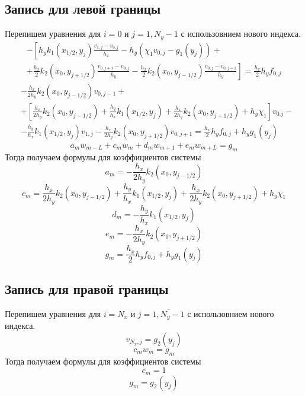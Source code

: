 \subsection{Запись для левой границы}
Перепишем уравнения для $i = 0$ и $j = \overline{1,N_y-1}$ с использовнием нового индекса.
\begin{multline*}
    - \left[
    h_y k_1(x_{1/2},y_{j}) \frac{v_{1,j} - v_{0,j}}{h_x} - h_y \left( \chi_1 v_{0,j} - g_1(y_{j}) \right) + \right. \\
    \left. +
    \frac{h_x}{2} k_2(x_{0},y_{j+1/2}) \frac{v_{0,j+1} - v_{0,j}}{h_y} - \frac{h_x}{2} k_2(x_{0},y_{j-1/2}) \frac{v_{0,j} - v_{0,j-1}}{h_y}
    \right] =
    \frac{h_x}{2} h_y f_{0,j}
\end{multline*}
\[
\begin{split}
    &-\frac{h_x}{2 h_y} k_2(x_{0},y_{j-1/2}) v_{0,j-1} +\\
    &+\left[ \frac{h_x}{2 h_y} k_2(x_{0},y_{j-1/2}) + \frac{h_y}{h_x} k_1(x_{1/2},y_{j}) + \frac{h_x}{2 h_y} k_2(x_{0},y_{j+1/2}) + h_y \chi_1 \right] v_{0.j} - \\
    &-\frac{h_y}{h_x} k_1(x_{1/2},y_{j}) v_{1,j} - \frac{h_x}{2 h_y} k_2(x_{0},y_{j+1/2}) v_{0,j+1} = \frac{h_x}{2} h_y f_{0,j} + h_y g_1(y_j)
\end{split}
\]
\[ a_m w_{m - L} + c_m w_m + d_m w_{m + 1} + e_m w_{m + L} = g_m \]
Тогда получаем формулы для коэффициентов системы
\[ a_m = -\frac{h_x}{2 h_y} k_2(x_{0},y_{j-1/2}) \]
\[ c_m = \frac{h_x}{2 h_y} k_2(x_{0},y_{j-1/2}) + \frac{h_y}{h_x} k_1(x_{1/2},y_{j}) + \frac{h_x}{2 h_y} k_2(x_{0},y_{j+1/2}) + h_y \chi_1 \]
\[ d_m = -\frac{h_y}{h_x} k_1(x_{1/2},y_{j}) \]
\[ e_m = -\frac{h_x}{2 h_y} k_2(x_{0},y_{j+1/2}) \]
\[ g_m = \frac{h_x}{2} h_y f_{0,j} + h_y g_1(y_j) \]

\subsection{Запись для правой границы}
Перепишем уравнения для $i = N_x$ и $j = \overline{1,N_y-1}$ с использовнием нового индекса.
\[ v_{N_x,j} = g_2(y_j) \]
\[ c_m w_m = g_m \]
Тогда получаем формулы для коэффициентов системы
\[ c_m = 1 \]
\[ g_m = g_2(y_j) \]

